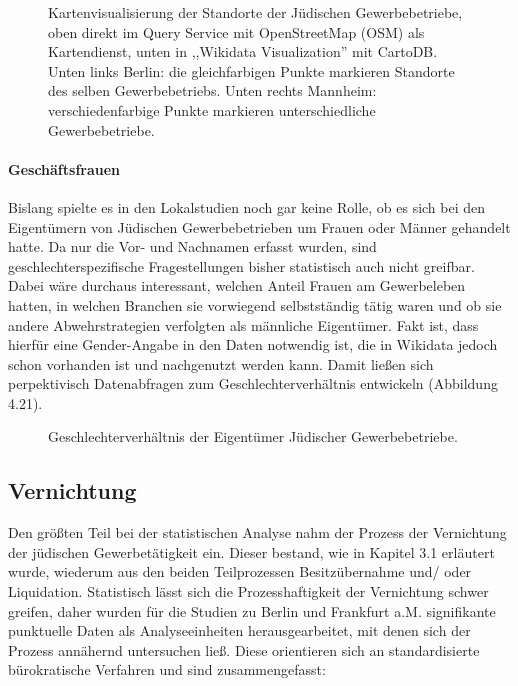 \begin{figure}[h]
    \centering
    \caption{Kartenvisualisierung der Standorte der Jüdischen Gewerbebetriebe, oben direkt im Query Service mit OpenStreetMap (OSM) als Kartendienst, unten in ,,Wikidata Visualization'' mit CartoDB. Unten links Berlin: die gleichfarbigen Punkte markieren Standorte des selben Gewerbebetriebs. Unten rechts Mannheim: verschiedenfarbige Punkte markieren unterschiedliche Gewerbebetriebe.}
    \label{fig:x cubed graph}
\end{figure}

\paragraph{Geschäftsfrauen}
Bislang spielte es in den Lokalstudien noch gar keine Rolle, ob es sich bei den Eigentümern von Jüdischen Gewerbebetrieben um Frauen oder Männer gehandelt hatte. Da nur die Vor- und Nachnamen erfasst wurden, sind geschlechterspezifische Fragestellungen bisher statistisch auch nicht greifbar. Dabei wäre durchaus interessant, welchen Anteil Frauen am Gewerbeleben hatten, in welchen Branchen sie vorwiegend selbstständig tätig waren und ob sie andere Abwehrstrategien verfolgten als männliche Eigentümer. Fakt ist, dass hierfür eine Gender-Angabe in den Daten notwendig ist, die in Wikidata jedoch schon vorhanden ist und nachgenutzt werden kann. Damit ließen sich perpektivisch Datenabfragen zum Geschlechterverhältnis entwickeln (Abbildung 4.21). 

\begin{figure}[h]
    \centering
    \caption{Geschlechterverhältnis der Eigentümer Jüdischer Gewerbebetriebe.}
    \label{fig:x cubed graph}
\end{figure}

\subsection{Vernichtung}

Den größten Teil bei der statistischen Analyse nahm der Prozess der Vernichtung der jüdischen Gewerbetätigkeit ein. Dieser bestand, wie in Kapitel 3.1 erläutert wurde, wiederum aus den beiden Teilprozessen Besitzübernahme und/ oder Liquidation. Statistisch lässt sich die Prozesshaftigkeit der Vernichtung schwer greifen, daher wurden für die Studien zu Berlin und Frankfurt a.M. signifikante punktuelle Daten als Analyseeinheiten herausgearbeitet, mit denen sich der Prozess annähernd untersuchen ließ. Diese orientieren sich an standardisierte bürokratische Verfahren und sind zusammengefasst:

